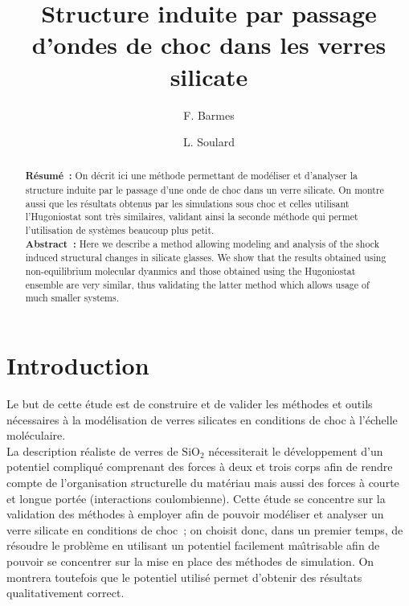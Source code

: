 \documentclass[aps,10pt,twocolumn]{revtex4}
\newcommand{\mrm}[1]{\ensuremath{\mathrm{#1}}\xspace}
\newcommand{\SiOTwo}{\ensuremath{\mrm{SiO_2}}\xspace}
\begin{document}
\graphicspath
{
{../imgs/}
}

\title{Structure induite par passage d'ondes de choc dans les verres silicate}
\author{F. Barmes}

\author{L. Soulard}



\noaffiliation

\begin{abstract}
\textbf{R\'esum\'e~:} On d\'ecrit ici une m\'ethode permettant de mod\'eliser et d'analyser la
structure induite par le passage d'une onde de choc dans un verre silicate. On montre aussi que
les r\'esultats obtenus par les simulations sous choc et celles utilisant l'Hugoniostat sont
tr\`es similaires, validant ainsi la seconde m\'ethode qui permet l'utilisation de syst\`emes
beaucoup plus petit.\\ 


\textbf{Abstract~:} Here we describe a method allowing modeling and analysis of the shock
induced structural changes in silicate glasses. We show that the results obtained using
non-equilibrium molecular dyanmics and those obtained using the Hugoniostat ensemble are very
similar, thus validating the latter method which allows usage of much smaller systems.
\end{abstract}

\maketitle


\section*{Introduction}

Le but de cette \'etude est de construire et de valider les m\'ethodes et outils n\'ecessaires \`a la
mod\'elisation de verres silicates en conditions de choc \`a l'\'echelle mol\'eculaire.\\
La description r\'ealiste de verres de \SiOTwo n\'ecessiterait le d\'eveloppement d'un potentiel
compliqu\'e comprenant des forces \`a deux et trois corps afin de rendre compte de
l'organisation structurelle du mat\'eriau mais aussi des forces \`a courte et longue port\'ee
(interactions coulombienne). Cette \'etude se concentre sur la validation
des m\'ethodes \`a employer afin de pouvoir mod\'eliser et analyser un verre silicate en
conditions de choc~; on choisit donc, dans un premier temps, de r\'esoudre le probl\`eme en
utilisant un potentiel facilement ma\^{\i}trisable afin de pouvoir se concentrer sur la mise en place
des m\'ethodes de simulation. On montrera toutefois que le potentiel utilis\'e permet d'obtenir
des r\'esultats qualitativement correct.
\end{document}
